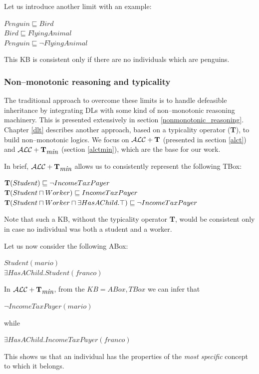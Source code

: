 \documentclass[a4paper, 11pt, oneside]{duthesis}
\newcommand{\tip}{{\bf T}}
\newcommand{\alct}{\mathcal{ALC}+\tip}
\newcommand{\alctmin}{\mathcal{ALC}+\tip_{\mbox{\em min}}}
\begin{document}
Let us introduce another limit with an example:
\begin{center}
$Penguin \sqsubseteq Bird$\\
$Bird \sqsubseteq FlyingAnimal$\\
$Penguin \sqsubseteq \neg FlyingAnimal$
\end{center}
This KB is consistent only if there are no individuals which are penguins.

\subsubsection{Non--monotonic reasoning and typicality}

The traditional approach to overcome these limits is to handle defeasible inheritance by integrating DLs with some kind of non--monotonic reasoning machinery. This is presented extensively in section \ref{nonmonotonic_reasoning}.\\

Chapter \ref{dlt} describes another approach, based on a typicality operator (\tip), to build non--monotonic logics. We focus on $\alct$ (presented in section \ref{alct}) and $\alctmin$ (section \ref{alctmin}), which are the base for our work.

In brief, $\alctmin$ allows us to consistently represent the following TBox:
\begin{center}
$\tip(Student) \sqsubseteq \neg IncomeTaxPayer$\\
$\tip(Student \sqcap Worker) \sqsubseteq IncomeTaxPayer$\\
$\tip(Student \sqcap Worker \sqcap \exists HasAChild.\top) \sqsubseteq \neg IncomeTaxPayer$
\end{center}
Note that such a KB, without the typicality operator \tip, would be consistent only in case no individual was both a student and a worker.

\newpage

Let us now consider the following ABox:
\begin{center}$Student(mario)$\\
$\exists HasAChild.Student(franco)$\end{center}

In $\alctmin$, from the $KB={ABox, TBox}$ we can infer that
\begin{center}$\neg IncomeTaxPayer(mario)$\end{center}
while
\begin{center}$\exists HasAChild.IncomeTaxPayer(franco)$\end{center}
This shows us that an individual has the properties of the \emph{most specific} concept to which it belongs.\\
\end{document}
